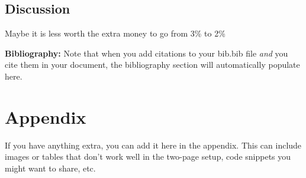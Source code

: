 \documentclass{article}\usepackage[]{graphicx}\usepackage[]{xcolor}
\begin{document}
\begin{multicols}{2}
\section{Discussion}
Maybe it is less worth the extra money to go from 3\% to 2\%

\vspace{2em}

\noindent\textbf{Bibliography:} Note that when you add citations to your bib.bib file \emph{and}
you cite them in your document, the bibliography section will automatically populate here.

\begin{tiny}

\end{tiny}
\end{multicols}

\newpage
\onecolumn
\section{Appendix}

If you have anything extra, you can add it here in the appendix. This can include images or tables that don't work well in the two-page setup, code snippets you might want to share, etc.
\end{document}
